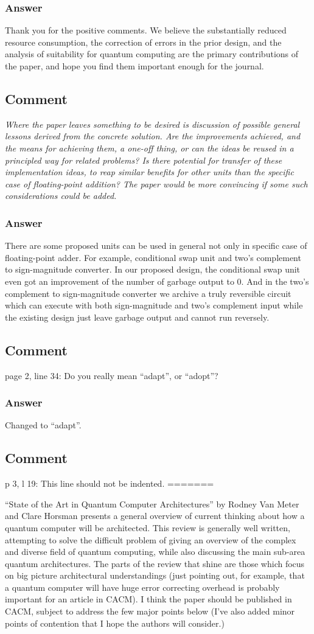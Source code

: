 \documentclass{article}
\newcommand{\comment}{\subsection{Comment}\em}
\newcommand{\answer}{\rm \subsubsection*{Answer}}
\begin{document}
\answer

Thank you for the positive comments.  We believe the substantially reduced resource consumption, the correction of errors in the prior design, and the analysis of suitability for quantum computing are the primary contributions of the paper, and hope you find them important enough for the journal.

\comment
Where the paper leaves something to be desired is discussion of possible general
lessons derived from the concrete solution. Are the improvements achieved, and
the means for achieving them, a one-off thing, or can the ideas be reused in
a principled way for related problems? Is there potential for transfer of these
implementation ideas, to reap similar benefits for other units than the specific
case of floating-point addition? The paper would be more convincing if some
such considerations could be added.

\answer

There are some proposed units can be used in general not only in specific case of floating-point adder. For example, conditional swap unit and two's complement to sign-magnitude converter. In our proposed design, the conditional swap unit
even got an improvement of the number of garbage output to 0. And in the two's
complement to sign-magnitude converter we archive a truly reversible circuit
which can execute with both sign-magnitude and two's complement input while
the existing design just leave garbage output and cannot run reversely.

\comment

page 2, line 34: Do you really mean ``adapt'', or ``adopt''?

\answer

Changed to ``adapt''.

\comment

p 3, l 19: This line should not be indented.
=======

``State of the Art in Quantum Computer Architectures'' by Rodney Van
Meter and Clare Horsman presents a general overview of current
thinking about how a quantum computer will be architected.  This
review is generally well written, attempting to solve the difficult
problem of giving an overview of the complex and diverse field of
quantum computing, while also discussing the main sub-area quantum
architectures.  The parts of the review that shine are those which
focus on big picture architectural understandings (just pointing out,
for example, that a quantum computer will have huge error correcting
overhead is probably important for an article in CACM).  I think the
paper should be published in CACM, subject to address the few major
points below (I've also added minor points of contention that I hope
the authors will consider.)
\end{document}
